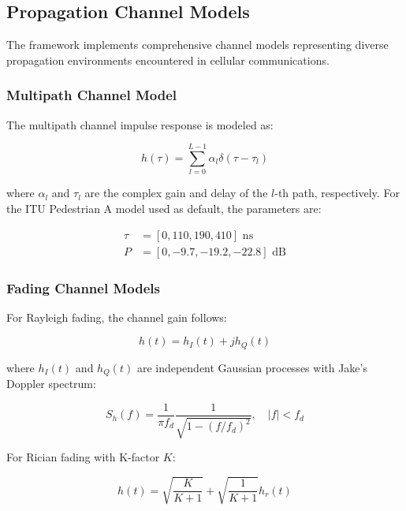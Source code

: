 \documentclass[conference]{IEEEtran}
\begin{document}
\subsection{Propagation Channel Models}

The framework implements comprehensive channel models representing diverse propagation environments encountered in cellular communications.

\subsubsection{Multipath Channel Model}

The multipath channel impulse response is modeled as:

\begin{equation}
h(\tau) = \sum_{l=0}^{L-1} \alpha_l \delta(\tau - \tau_l)
\label{eq:multipath}
\end{equation}

where $\alpha_l$ and $\tau_l$ are the complex gain and delay of the $l$-th path, respectively. For the ITU Pedestrian A model used as default, the parameters are:

\begin{align}
\tau &= [0, 110, 190, 410] \text{ ns} \\
P &= [0, -9.7, -19.2, -22.8] \text{ dB}
\end{align}

\subsubsection{Fading Channel Models}

For Rayleigh fading, the channel gain follows:

\begin{equation}
h(t) = h_I(t) + jh_Q(t)
\label{eq:rayleigh}
\end{equation}

where $h_I(t)$ and $h_Q(t)$ are independent Gaussian processes with Jake's Doppler spectrum:

\begin{equation}
S_h(f) = \frac{1}{\pi f_d} \frac{1}{\sqrt{1-(f/f_d)^2}}, \quad |f| < f_d
\label{eq:jakes_spectrum}
\end{equation}

For Rician fading with K-factor $K$:

\begin{equation}
h(t) = \sqrt{\frac{K}{K+1}} + \sqrt{\frac{1}{K+1}} h_r(t)
\label{eq:rician}
\end{equation}
\end{document}
